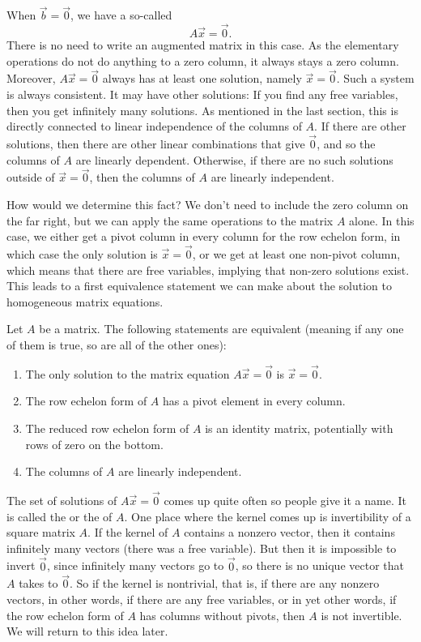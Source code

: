 \documentclass{ximera}
\begin{document}
When $\vec{b} = \vec{0}$, we have a so-called \emph{}
\begin{equation*}
    A \vec{x} = \vec{0} .
\end{equation*}
There is no need to write an augmented matrix in this case.  As the elementary operations do not do anything to a zero column, it always stays a zero column.  Moreover, $A \vec{x} = \vec{0}$ always has at least one solution, namely $\vec{x} = \vec{0}$.  Such a system is always consistent.  It may have other solutions:  If you find any free variables, then you get infinitely many solutions. As mentioned in the last section, this is directly connected to linear independence of the columns of $A$. If there are other solutions, then there are other linear combinations that give $\vec{0}$, and so the columns of $A$ are linearly dependent. Otherwise, if there are no such solutions outside of $\vec{x} = \vec{0}$, then the columns of $A$ are linearly independent.

How would we determine this fact? We don't need to include the zero column on the far right, but we can apply the same operations to the matrix $A$ alone. In this case, we either get a pivot column in every column for the row echelon form, in which case the only solution is $\vec{x} = \vec{0}$, or we get at least one non-pivot column, which means that there are free variables, implying that non-zero solutions exist. This leads to a first equivalence statement we can make about the solution to homogeneous matrix equations.

\begin{theorem}
    Let $A$ be a matrix. The following statements are equivalent (meaning if any one of them is true, so are all of the other ones):
    \begin{enumerate}
        \item The only solution to the matrix equation $A\vec{x} = \vec{0}$ is $\vec{x} = \vec{0}$. 
        \item The row echelon form of $A$ has a pivot element in every column.
        \item The reduced row echelon form of $A$ is an identity matrix, potentially with rows of zero on the bottom.
        \item The columns of $A$ are linearly independent.
    \end{enumerate}
\end{theorem} 

The set of solutions of $A \vec{x} = \vec{0}$ comes up quite often so people give it a name.  It is called the \emph{} or the \emph{} of $A$. One place where the kernel comes up is invertibility of a square matrix $A$. If the kernel of $A$ contains a nonzero vector, then it contains infinitely many vectors (there was a free variable).  But then it is impossible to invert $\vec{0}$, since infinitely many vectors go to $\vec{0}$, so there is no unique vector that $A$ takes to $\vec{0}$. So if the kernel is nontrivial, that is, if there are any nonzero vectors, in other words, if there are any free variables, or in yet other words, if the row echelon form of $A$ has columns without pivots, then $A$ is not invertible.  We will return to this idea later.
\end{document}

